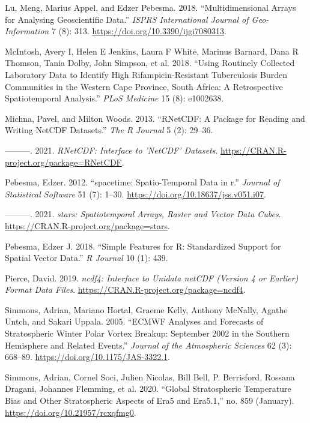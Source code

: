 \documentclass{article}
\newlength{\cslhangindent}
\newlength{\cslentryspacingunit} %
\newenvironment{CSLReferences}[2] %
 {%
  \setlength{\parindent}{0pt}
  \ifodd #1
  \let\oldpar\par
  \def\par{\hangindent=\cslhangindent\oldpar}
  \fi
  \setlength{\parskip}{#2\cslentryspacingunit}
 }%
 {}
\begin{document}
\begin{CSLReferences}{1}{0}
\leavevmode\hypertarget{ref-lu_multidimensional_2018}{}%
Lu, Meng, Marius Appel, and Edzer Pebesma. 2018. {``Multidimensional {Arrays} for {Analysing} {Geoscientific} {Data}.''} \emph{ISPRS International Journal of Geo-Information} 7 (8): 313. \url{https://doi.org/10.3390/ijgi7080313}.

\leavevmode\hypertarget{ref-mcintosh2018using}{}%
McIntosh, Avery I, Helen E Jenkins, Laura F White, Marinus Barnard, Dana R Thomson, Tania Dolby, John Simpson, et al. 2018. {``Using Routinely Collected Laboratory Data to Identify High Rifampicin-Resistant Tuberculosis Burden Communities in the Western Cape Province, South Africa: A Retrospective Spatiotemporal Analysis.''} \emph{PLoS Medicine} 15 (8): e1002638.

\leavevmode\hypertarget{ref-michna2013rnetcdf}{}%
Michna, Pavel, and Milton Woods. 2013. {``{RNetCDF}: A Package for Reading and Writing NetCDF Datasets.''} \emph{The R Journal} 5 (2): 29--36.

\leavevmode\hypertarget{ref-rnetcdf}{}%
---------. 2021. \emph{{RNetCDF}: Interface to 'NetCDF' Datasets}. \url{https://CRAN.R-project.org/package=RNetCDF}.

\leavevmode\hypertarget{ref-spacetime}{}%
Pebesma, Edzer. 2012. {``{spacetime}: Spatio-Temporal Data in r.''} \emph{Journal of Statistical Software} 51 (7): 1--30. \url{https://doi.org/10.18637/jss.v051.i07}.

\leavevmode\hypertarget{ref-stars}{}%
---------. 2021. \emph{{stars}: Spatiotemporal Arrays, Raster and Vector Data Cubes}. \url{https://CRAN.R-project.org/package=stars}.

\leavevmode\hypertarget{ref-sf}{}%
Pebesma, Edzer J. 2018. {``Simple Features for {R}: Standardized Support for Spatial Vector Data.''} \emph{R Journal} 10 (1): 439.

\leavevmode\hypertarget{ref-ncdf4}{}%
Pierce, David. 2019. \emph{{ncdf4}: Interface to Unidata netCDF (Version 4 or Earlier) Format Data Files}. \url{https://CRAN.R-project.org/package=ncdf4}.

\leavevmode\hypertarget{ref-simmons2005ecmwf}{}%
Simmons, Adrian, Mariano Hortal, Graeme Kelly, Anthony McNally, Agathe Untch, and Sakari Uppala. 2005. {``ECMWF Analyses and Forecasts of Stratospheric Winter Polar Vortex Breakup: September 2002 in the Southern Hemisphere and Related Events.''} \emph{Journal of the Atmospheric Sciences} 62 (3): 668--89. \url{https://doi.org/10.1175/JAS-3322.1}.

\leavevmode\hypertarget{ref-simmons2020global}{}%
Simmons, Adrian, Cornel Soci, Julien Nicolas, Bill Bell, P. Berrisford, Rossana Dragani, Johannes Flemming, et al. 2020. {``Global Stratospheric Temperature Bias and Other Stratospheric Aspects of Era5 and Era5.1,''} no. 859 (January). \url{https://doi.org/10.21957/rcxqfmg0}.


\end{CSLReferences}
\end{document}
